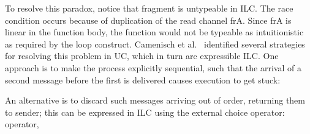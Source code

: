 To resolve this paradox, notice that fragment is untypeable in ILC.
The race condition occurs because of duplication of the read channel \textsf{frA}.
Since \textsf{frA} is linear in the function body, the function would not be typeable as intuitionistic as required by the \textsf{loop} construct.
Camenisch et al.~\cite{camenisch2016universal} identified several strategies for resolving this problem in UC, which in turn are expressible ILC. One approach is to make the process explicitly sequential, such that the arrival of a second message before the first is delivered causes execution to get stuck:

An alternative is to discard such messages arriving out of order, returning them to sender; this can be expressed in ILC using the external choice operator:
operator,

